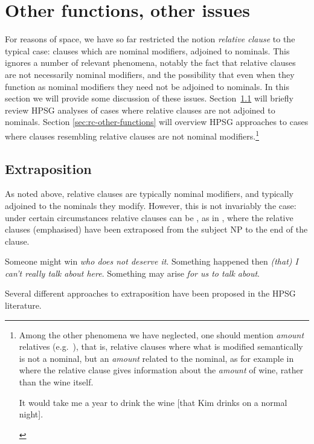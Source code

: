\documentclass[output=paper
 	        ,biblatex
                ,babelshorthands
                ,newtxmath
                ,draftmode
                ,colorlinks, citecolor=brown
]{langscibook}
\begin{document}
\section{Other functions, other issues}
\label{sec:rc-other-functions-other-issues}
For reasons of space, we have so far restricted the notion \emph{relative clause} to the
typical case: clauses which are nominal modifiers, adjoined to nominals. This ignores a
number of relevant phenomena, notably the fact that relative clauses
are not necessarily nominal modifiers, and the possibility that even when they function as
nominal modifiers they need not be adjoined to nominals. In this section we will provide
some discussion of these issues. Section~\ref{sec:rc-extraposition} will briefly review
HPSG analyses of cases where relative clauses are not adjoined to nominals. Section
\ref{sec:rc-other-functions} will overview HPSG approaches to cases where clauses resembling relative
clauses are not nominal modifiers.\footnote{Among the other phenomena we have neglected,
  one should mention \emph{amount} relatives (e.g.\ \citealt{grosu2016amount}), that is, relative clauses where what is
  modified semantically is not a nominal, but an \emph{amount} related to the nominal, as
  for example in  where the relative clause gives information about the \emph{amount}
  of wine, rather than the wine itself.
  \begin{exe}\ex\label{x:rc-120}
    It would take me a year to drink the wine [that Kim drinks on a normal night].  
  \end{exe}
}

\subsection{Extraposition}
\label{sec:rc-extraposition}

%
As noted above, relative clauses are typically nominal modifiers, and typically adjoined
to the nominals they modify. However, this is not invariably the case: under certain
circumstances relative clauses can be , as in , where the
relative clauses (emphasised) have been extraposed from the subject NP to the end of the
clause.
\begin{exe}\ex\begin{xlist}\label{x:rc-121}
  \ex\label{x:rc-122} Someone might win \emph{who does not deserve it}.
  \ex\label{x:rc-123} Something happened then \emph{(that) I can't really talk about here}.
  \ex\label{x:rc-124} Something may arise \emph{for us to talk about}.
\end{xlist}\end{exe}
Several different approaches to extraposition have been proposed in the HPSG literature.
\end{document}
